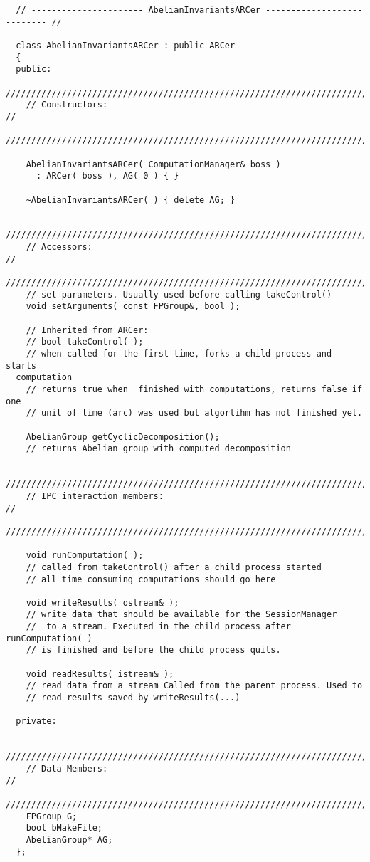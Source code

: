 \documentclass[12pt]{article}
\begin{document}
   \scriptsize
  \begin{verbatim}
  // ---------------------- AbelianInvariantsARCer --------------------------- //

  class AbelianInvariantsARCer : public ARCer
  {
  public:
    ////////////////////////////////////////////////////////////////////////
    // Constructors:                                                      //
    ////////////////////////////////////////////////////////////////////////

    AbelianInvariantsARCer( ComputationManager& boss ) 
      : ARCer( boss ), AG( 0 ) { } 

    ~AbelianInvariantsARCer( ) { delete AG; } 

    /////////////////////////////////////////////////////////////////////////
    // Accessors:                                                          //
    /////////////////////////////////////////////////////////////////////////
    // set parameters. Usually used before calling takeControl()
    void setArguments( const FPGroup&, bool );

    // Inherited from ARCer:
    // bool takeControl( );  
    // when called for the first time, forks a child process and starts 
  computation 
    // returns true when  finished with computations, returns false if one
    // unit of time (arc) was used but algortihm has not finished yet.

    AbelianGroup getCyclicDecomposition();
    // returns Abelian group with computed decomposition  

    /////////////////////////////////////////////////////////////////////////
    // IPC interaction members:                                            //
    /////////////////////////////////////////////////////////////////////////

    void runComputation( ); 
    // called from takeControl() after a child process started
    // all time consuming computations should go here 

    void writeResults( ostream& ); 
    // write data that should be available for the SessionManager
    //  to a stream. Executed in the child process after  runComputation( )
    // is finished and before the child process quits. 
    
    void readResults( istream& );  
    // read data from a stream Called from the parent process. Used to 
    // read results saved by writeResults(...)

  private:

    /////////////////////////////////////////////////////////////////////////
    // Data Members:                                                       //
    /////////////////////////////////////////////////////////////////////////
    FPGroup G;  
    bool bMakeFile;
    AbelianGroup* AG;
  };
  \end{verbatim}
  \normalsize
\end{document}
